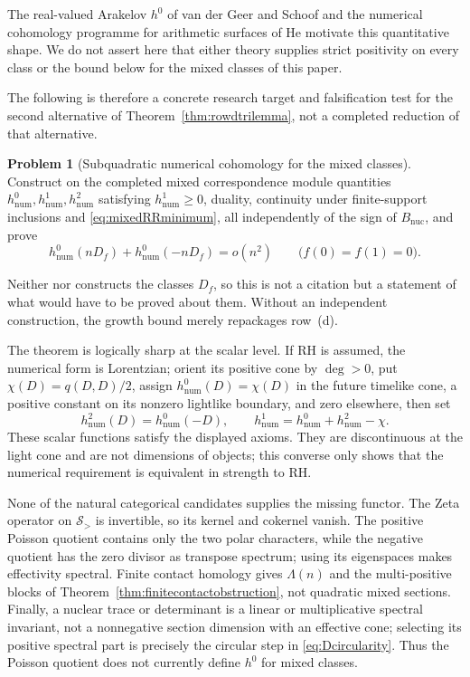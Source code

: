 \documentclass[11pt]{amsart}
\theoremstyle{definition}
\newtheorem{problem}[theorem]{Problem}
\theoremstyle{remark}
\newcommand{\RH}{\mathrm{RH}}
\begin{document}
The real-valued Arakelov $h^0$ of van der Geer and Schoof
\cite{GeerSchoof} and the numerical cohomology programme for arithmetic
surfaces of He \cite{He2025} motivate this quantitative shape.  We do not
assert here that either theory supplies strict positivity on every class or
the bound below for the mixed classes of this paper.

The following is therefore a concrete research target and falsification
test for the second alternative of Theorem~\ref{thm:rowdtrilemma}, not a
completed reduction of that alternative.

\begin{problem}[Subquadratic numerical cohomology for the mixed classes]
\label{prob:subquadratic}
Construct on the completed mixed correspondence module quantities
$h^0_{\mathrm{num}},h^1_{\mathrm{num}},h^2_{\mathrm{num}}$ satisfying
$h^1_{\mathrm{num}}\ge0$, duality, continuity under finite-support
inclusions and \eqref{eq:mixedRRminimum}, all independently of the sign of
$B_{\mathrm{nuc}}$, and prove
\[
 h^0_{\mathrm{num}}(nD_f)+h^0_{\mathrm{num}}(-nD_f)=o(n^2)
 \qquad\bigl(\widehat f(0)=\widehat f(1)=0\bigr).
\]
\end{problem}

Neither \cite{GeerSchoof} nor \cite{He2025} constructs the classes $D_f$, so
this is not a citation but a statement of what would have to be proved about
them.  Without an independent construction, the growth bound merely repackages
row~(d).

The theorem is logically sharp at the scalar level.  If $\RH$ is assumed,
the numerical form is Lorentzian; orient its positive cone by $\deg>0$, put
$\chi(D)=q(D,D)/2$, assign $h^0_{\mathrm{num}}(D)=\chi(D)$ in the future
timelike cone, a positive constant on its nonzero lightlike boundary, and
zero elsewhere, then set
\[
 h^2_{\mathrm{num}}(D)=h^0_{\mathrm{num}}(-D),\qquad
 h^1_{\mathrm{num}}=h^0_{\mathrm{num}}+h^2_{\mathrm{num}}-\chi.
\]
These scalar functions satisfy the displayed axioms.  They are discontinuous
at the light cone and are not dimensions of objects; this converse only
shows that the numerical requirement is equivalent in strength to $\RH$.

None of the natural categorical candidates supplies the missing functor.
The Zeta operator on $\mathcal S_>$ is invertible, so its kernel and cokernel
vanish.  The positive Poisson quotient contains only the two polar
characters, while the negative quotient has the zero divisor as transpose
spectrum; using its eigenspaces makes effectivity spectral.  Finite contact
homology gives $\Lambda(n)$ and the multi-positive blocks of
Theorem~\ref{thm:finitecontactobstruction}, not quadratic mixed sections.
Finally, a nuclear trace or determinant is a linear or multiplicative
spectral invariant, not a nonnegative section dimension with an effective
cone; selecting its positive spectral part is precisely the circular step
in \eqref{eq:Dcircularity}.  Thus the Poisson quotient does not currently define
$h^0$ for mixed classes.
\end{document}
